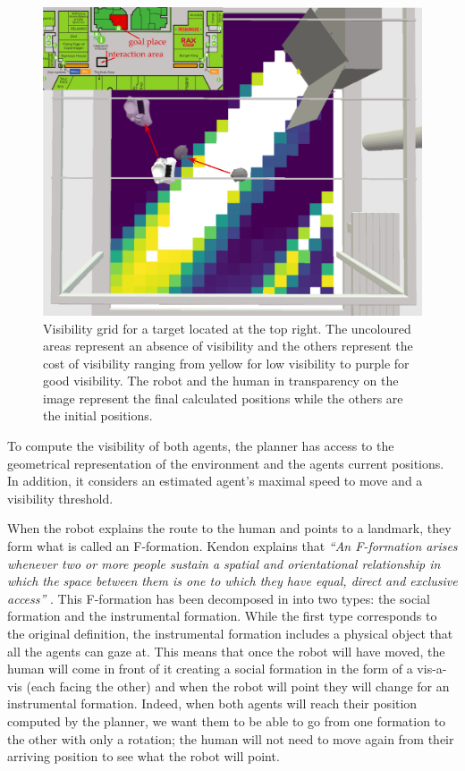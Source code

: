 \begin{figure}[b!]
\centering
\includegraphics[scale=0.3]{figures/chapter8/grid_map.png}
\caption{\label{fig:chap8_svp_grid} Visibility grid for a target located at the top right. The uncoloured areas represent an absence of visibility and the others represent the cost of visibility ranging from yellow for low visibility to purple for good visibility. The robot and the human in transparency on the image represent the final calculated positions while the others are the initial positions. }
\end{figure}

To compute the visibility of both agents, the planner has access to the geometrical representation of the environment and the agents current positions. In addition, it considers an estimated agent's maximal speed to move and a visibility threshold.

When the robot explains the route to the human and points to a landmark, they form what is called an F-formation. Kendon explains that \textit{``An F-formation arises whenever two or more people sustain a spatial and orientational relationship in which the space between them is one to which they have equal, direct and exclusive access''} \cite{kendon_1990_conducting}.
This F-formation has been decomposed in \cite{mcneill_2005_gesture} into two types: the social formation and the instrumental formation. While the first type corresponds to the original definition, the instrumental formation includes a physical object that all the agents can gaze at. This means that once the robot will have moved, the human will come in front of it creating a social formation in the form of a vis-a-vis (each facing the other) and when the robot will point they will change for an instrumental formation. Indeed, when both agents will reach their position computed by the planner, we want them to be able to go from one formation to the other with only a rotation; the human will not need to move again from their arriving position to see what the robot will point. 

